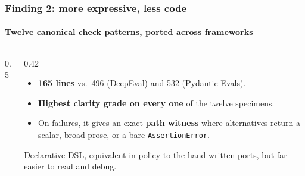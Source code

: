 \documentclass[
	aspectratio=169, %
	t,               %
	onlytextwidth,
	10pt,
]{beamer}
\begin{document}
\begin{frame}
	\frametitle{Finding 2: more expressive, less code}
	\framesubtitle{Twelve canonical check patterns, ported across frameworks}
	\begin{columns}[T,onlytextwidth]
		\begin{column}{0.5\linewidth}
			\centering
			\vspace{0.3em}
		\end{column}
		\hfill
		\begin{column}{0.42\linewidth}
			\begin{itemize}
				\setlength\itemsep{0.6em}
				\item \textbf{165 lines} vs.\ 496 (DeepEval) and 532 (Pydantic Evals).
				\item \textbf{Highest clarity grade on every one} of the twelve specimens.
				\item On failures, it gives an exact \textbf{path witness} where alternatives return a
				scalar, broad prose, or a bare \texttt{AssertionError}.
			\end{itemize}
			\vspace{0.3em}
			{\footnotesize\textcolor{ICLBlue}{Declarative DSL, equivalent in policy to the hand-written ports,
			but far easier to read and debug.}}
		\end{column}
	\end{columns}
\end{frame}
\end{document}
